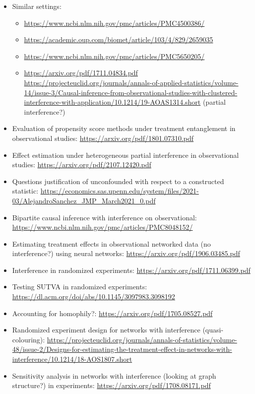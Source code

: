\documentclass[10pt]{article}
\begin{document}
\begin{itemize}

\item
Similar settings:
\begin{itemize}
\item
\url{https://www.ncbi.nlm.nih.gov/pmc/articles/PMC4500386/}
\item
\url{https://academic.oup.com/biomet/article/103/4/829/2659035}
\item
\url{https://www.ncbi.nlm.nih.gov/pmc/articles/PMC5650205/}
\item
\url{https://arxiv.org/pdf/1711.04834.pdf} \url{https://projecteuclid.org/journals/annals-of-applied-statistics/volume-14/issue-3/Causal-inference-from-observational-studies-with-clustered-interference-with-application/10.1214/19-AOAS1314.short} (partial interference?)
\end{itemize}

\item
Evaluation of propensity score methods under treatment entanglement in observational studies: \url{https://arxiv.org/pdf/1801.07310.pdf}

\item
Effect estimation under heterogeneous partial interference in observational studies: \url{https://arxiv.org/pdf/2107.12420.pdf}

\item
Questions justification of unconfounded with respect to a constructed statistic: \url{https://economics.sas.upenn.edu/system/files/2021-03/AlejandroSanchez_JMP_March2021_0.pdf}

\item
Bipartite causal inference with interference on observational: \url{https://www.ncbi.nlm.nih.gov/pmc/articles/PMC8048152/}

\item
Estimating treatment effects in observational networked data (no interference?) using neural networks: \url{https://arxiv.org/pdf/1906.03485.pdf}

\item
Interference in randomized experiments: \url{https://arxiv.org/pdf/1711.06399.pdf}

\item
Testing SUTVA in randomized experiments: \url{https://dl.acm.org/doi/abs/10.1145/3097983.3098192}

\item
Accounting for homophily?: \url{https://arxiv.org/pdf/1705.08527.pdf}

\item
Randomized experiment design for networks with interference (quasi-colouring): \url{https://projecteuclid.org/journals/annals-of-statistics/volume-48/issue-2/Designs-for-estimating-the-treatment-effect-in-networks-with-interference/10.1214/18-AOS1807.short}

\item
Sensitivity analysis in networks with interference (looking at graph structure?) in experiments: \url{https://arxiv.org/pdf/1708.08171.pdf}


\end{itemize}


\newpage

\printbibliography
\end{document}
